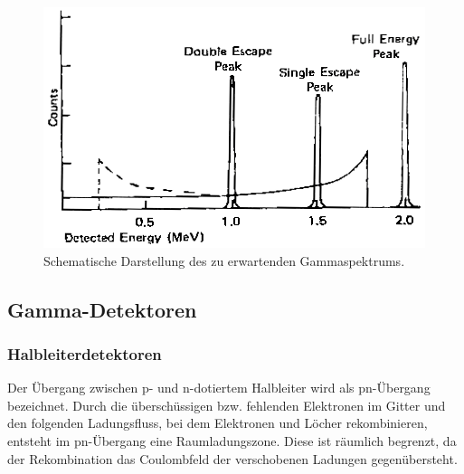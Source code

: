 \documentclass[
	a4paper,
	12pt,
	pagesize,
	ngerman
]{scrartcl}
\begin{document}
		\begin{figure}[H]
				\includegraphics[width= 0.75 \linewidth]{charts/Spektrumschema}
				\caption{
					Schematische Darstellung des zu erwartenden Gammaspektrums.
					\cite{Anleitung}
				}
				\label{fig_Gammaspektrum}
		\end{figure}

	\subsection{Gamma-Detektoren}

	\subsubsection{Halbleiterdetektoren}

	Der Übergang zwischen p- und n-dotiertem Halbleiter wird als pn-Übergang bezeichnet.
	Durch die überschüssigen bzw. fehlenden Elektronen im Gitter und den folgenden Ladungsfluss, bei dem Elektronen und Löcher rekombinieren, entsteht im pn-Übergang eine Raumladungszone.
	Diese ist räumlich begrenzt, da der Rekombination das Coulombfeld der verschobenen Ladungen gegenübersteht.
\end{document}
